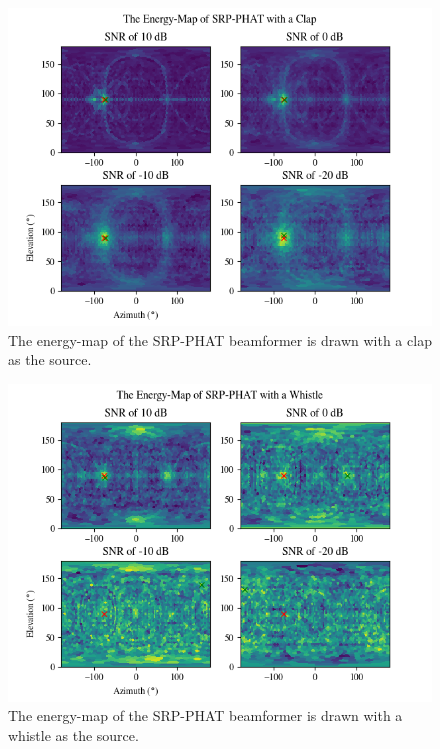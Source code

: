 \documentclass[notitlepage]{report}
\begin{document}
\begin{figure}[H]
\includegraphics[width=1\textwidth]{../Python/srp_phat/noise/clap/map.png}
\centering
\caption{The energy-map of the SRP-PHAT beamformer is drawn with a clap as the source.}
\label{fig:srp_phat_noise_map_clap}
\centering
\end{figure}

\begin{figure}[H]
\includegraphics[width=1\textwidth]{../Python/srp_phat/noise/whistle/map.png}
\centering
\caption{The energy-map of the SRP-PHAT beamformer is drawn with a whistle as the source.}
\label{fig:srp_phat_noise_map_whistle}
\centering
\end{figure}
\end{document}
